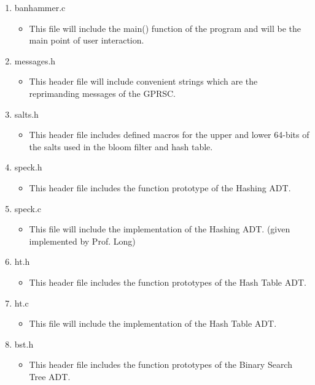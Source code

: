 \documentclass[
	12pt, %
]{fphw}
\begin{document}
\begin{enumerate}
	\item banhammer.c
	\begin{itemize}
		\item This file will include the main() function of the program and will be the main point of user interaction.
	\end{itemize}
	
	\item messages.h
	\begin{itemize}
		\item This header file will include convenient strings which are the reprimanding messages of the GPRSC.
	\end{itemize}
	
	\item salts.h
	\begin{itemize}
		\item This header file includes defined macros for the upper and lower 64-bits of the salts used in the bloom filter and hash table.
	\end{itemize}
	
	\item speck.h
	\begin{itemize}
		\item This header file includes the function prototype of the Hashing ADT.
	\end{itemize}
	
	\item speck.c
	\begin{itemize}
		\item This file will include the implementation of the Hashing ADT. (given implemented by Prof. Long)
	\end{itemize}
	
	\item ht.h
	\begin{itemize}
		\item This header file includes the function prototypes of the Hash Table ADT.
	\end{itemize}
	
	\item ht.c
	\begin{itemize}
		\item This file will include the implementation of the Hash Table ADT.
	\end{itemize}
	
	\item bst.h
	\begin{itemize}
		\item This header file includes the function prototypes of the Binary Search Tree ADT.
	\end{itemize}
	

\end{enumerate}
\end{document}
